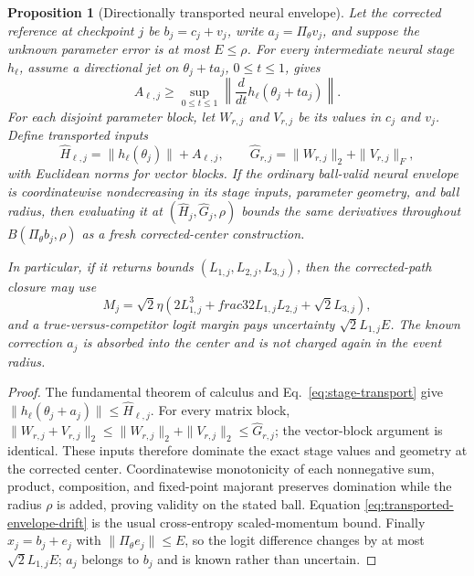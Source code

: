 \documentclass{article}
\newtheorem{proposition}{Proposition}
\begin{document}
\begin{proposition}[Directionally transported neural envelope]
\label{prop:transported-neural-envelope}
Let the corrected reference at checkpoint $j$ be
$b_j=c_j+v_j$, write $a_j=\Pi_\theta v_j$, and suppose the unknown parameter
error is at most $E\le\rho$.  For every intermediate neural stage $h_\ell$,
assume a directional jet on $\theta_j+ta_j$, $0\le t\le1$, gives
\begin{equation}
 A_{\ell,j}\ge
 \sup_{0\le t\le1}\left\|\frac{d}{dt}
 h_\ell(\theta_j+ta_j)\right\|.
 \label{eq:stage-transport}
\end{equation}
For each disjoint parameter block, let $W_{r,j}$ and $V_{r,j}$ be its values
in $c_j$ and $v_j$.  Define transported inputs
\begin{equation}
 \widehat H_{\ell,j}=\|h_\ell(\theta_j)\|+A_{\ell,j},
 \qquad
 \widehat G_{r,j}=\|W_{r,j}\|_2+\|V_{r,j}\|_F,
 \label{eq:transported-envelope-inputs}
\end{equation}
with Euclidean norms for vector blocks.  If the ordinary ball-valid neural
envelope is coordinatewise nondecreasing in its stage inputs, parameter
geometry, and ball radius, then evaluating it at
$(\widehat H_j,\widehat G_j,\rho)$ bounds the same derivatives throughout
$B(\Pi_\theta b_j,\rho)$ as a fresh corrected-center construction.

In particular, if it returns bounds $(L_{1,j},L_{2,j},L_{3,j})$, then the
corrected-path closure may use
\begin{equation}
 M_j=\sqrt2\eta\left(2L_{1,j}^3+	frac32L_{1,j}L_{2,j}
 +\sqrt2L_{3,j}\right),
 \label{eq:transported-envelope-drift}
\end{equation}
and a true-versus-competitor logit margin pays uncertainty
$\sqrt2L_{1,j}E$.  The known correction $a_j$ is absorbed into the center and
is not charged again in the event radius.
\end{proposition}

\begin{proof}
The fundamental theorem of calculus and Eq.~\eqref{eq:stage-transport} give
$\|h_\ell(\theta_j+a_j)\|\le\widehat H_{\ell,j}$.  For every matrix block,
$\|W_{r,j}+V_{r,j}\|_2\le\|W_{r,j}\|_2+\|V_{r,j}\|_2
\le\widehat G_{r,j}$; the vector-block argument is identical.  These inputs
therefore dominate the exact stage values and geometry at the corrected
center.  Coordinatewise monotonicity of each nonnegative sum, product,
composition, and fixed-point majorant preserves domination while the radius
$\rho$ is added, proving validity on the stated ball.  Equation
\eqref{eq:transported-envelope-drift} is the usual cross-entropy
scaled-momentum bound.  Finally
$x_j=b_j+e_j$ with $\|\Pi_\theta e_j\|\le E$, so the logit difference changes
by at most $\sqrt2L_{1,j}E$; $a_j$ belongs to $b_j$ and is known rather than
uncertain.
\end{proof}
\end{document}
